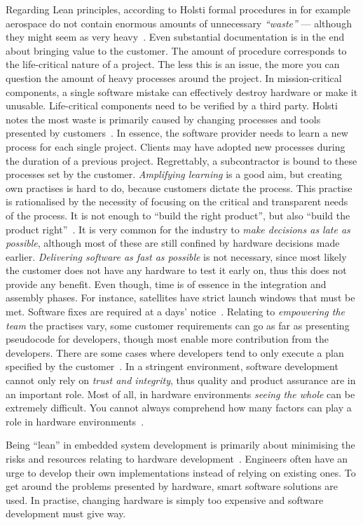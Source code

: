 \documentclass[english]{tktltiki2}
\begin{document}
Regarding Lean principles, according to Holsti formal procedures in for example aerospace do not contain enormous amounts of unnecessary \emph{“waste”} — although they might seem as very heavy~\cite{Hol15b}. Even substantial documentation is in the end about bringing value to the customer. The amount of procedure corresponds to the life-critical nature of a project. The less this is an issue, the more you can question the amount of heavy processes around the project. In mission-critical components, a single software mistake can effectively destroy hardware or make it unusable. Life-critical components need to be verified by a third party. Holsti notes the most waste is primarily caused by changing processes and tools presented by customers~\cite{Hol15b}. In essence, the software provider needs to learn a new process for each single project. Clients may have adopted new processes during the duration of a previous project. Regrettably, a subcontractor is bound to these processes set by the customer. \emph{Amplifying learning} is a good aim, but creating own practises is hard to do, because customers dictate the process. This practise is rationalised by the necessity of focusing on the critical and transparent needs of the process. It is not enough to “build the right product”, but also “build the product right”~\cite{Hol15b}. It is very common for the industry to \emph{make decisions as late as possible}, although most of these are still confined by hardware decisions made earlier. \emph{Delivering software as fast as possible} is not necessary, since most likely the customer does not have any hardware to test it early on, thus this does not provide any benefit. Even though, time is of essence in the integration and assembly phases. For instance, satellites have strict launch windows that must be met. Software fixes are required at a days’ notice~\cite{Hol15b}. Relating to \emph{empowering the team} the practises vary, some customer requirements can go as far as presenting pseudocode for developers, though most enable more contribution from the developers. There are some cases where developers tend to only execute a plan specified by the customer~\cite{Hol15b}. In a stringent environment, software development cannot only rely on \emph{trust and integrity}, thus quality and product assurance are in an important role. Most of all, in hardware environments \emph{seeing the whole} can be extremely difficult. You cannot always comprehend how many factors can play a role in hardware environments~\cite{Hol15a, Hol15b}.

Being “lean” in embedded system development is primarily about minimising the risks and resources relating to hardware development~\cite{Hol15a}. Engineers often have an urge to develop their own implementations instead of relying on existing ones. To get around the problems presented by hardware, smart software solutions are used. In practise, changing hardware is simply too expensive and software development must give way.
\end{document}
